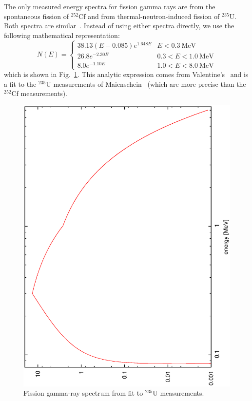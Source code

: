 The only measured energy spectra for fission gamma rays are from the spontaneous fission
of $^{252}$Cf and from thermal-neutron-induced fission of $^{235}$U.
Both spectra are similar~\cite{Wagemans 1991}. Instead of using either 
spectra directly, we use the following mathematical representation:
%
\begin{equation}
N(E) = \left\{
\begin{array}{ll}
38.13 (E-0.085)e^{1.648E}&  E<0.3\ \mathrm{MeV} \\

26.8 e^{-2.30E}          &  0.3<E<1.0\ \mathrm{MeV}\\

 8.0 e^{-1.10E}          &  1.0<E<8.0\ \mathrm{MeV}
\end{array}
\right.
\label{Fission gamma energy distribution for 235U}
\end{equation}
%
which is shown in Fig.~\ref{Fission gamma-ray spectrum for 235U}.
This analytic expression comes from Valentine's~\cite{Valentine 2000} and is a fit to the $^{235}$U
 measurements of Maienschein~\cite{Maienschein 1958,Goldstein 1959} (which are more
 precise than the $^{252}$Cf measurements).

\begin{figure}[ht]
\begin{center}
\includegraphics[scale=0.4, angle=-90]{eps/U235_gspectrum.eps}
\end{center}
\caption{Fission gamma-ray spectrum from fit to $^{235}$U measurements.}
\label{Fission gamma-ray spectrum for 235U}
\end{figure}

